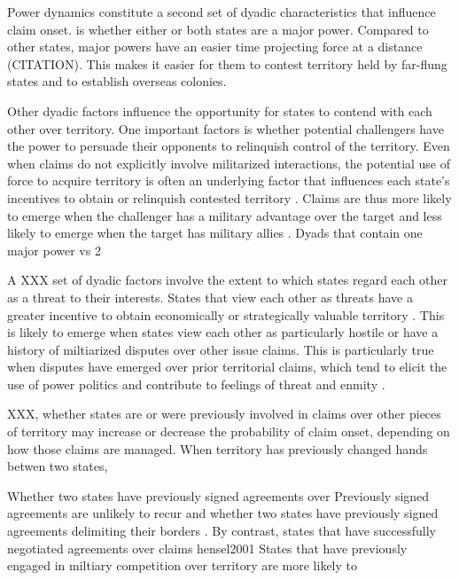 Power dynamics constitute a second set of dyadic characteristics that influence claim onset.
is whether either or both states are a major power. Compared to other states, major powers have an easier time projecting force at a distance (CITATION). This makes it easier for them to contest territory held by far-flung states and to establish overseas colonies.

Other dyadic factors influence the opportunity for states to contend with each other over territory. One important factors is whether potential challengers have the power to persuade their opponents to relinquish control of the territory. Even when claims do not explicitly involve militarized interactions, the potential use of force to acquire territory is often an underlying factor that influences each state’s incentives to obtain or relinquish contested territory \citep{huth2009, waltz2010}. Claims are thus more likely to emerge when the challenger has a military advantage over the target and less likely to emerge when the target has military allies \citep{huth2009}. 
Dyads that contain one major power vs 2

A XXX set of dyadic factors involve the extent to which states regard each other as a threat to their interests. States that view each other as threats have a greater incentive to obtain economically or strategically valuable territory \citep{colaresi2007, goertz2001}. This is likely to emerge when states view each other as particularly hostile or have a history of miltiarized disputes over other issue claims. This is particularly true when disputes have emerged over prior territorial claims, which tend to elicit the use of power politics and contribute to feelings of threat and enmity \citep{hensel2001, vasquez2009}.




XXX, whether states are or were previously involved in claims over other pieces of territory may increase or decrease the probability of claim onset, depending on how those claims are managed.
When territory has previously changed hands betwen two states,

Whether two states have previously signed agreements over 
Previously signed agreements are unlikely to recur
and whether two states have previously signed agreements delimiting their borders \citep{owsiak2012, huth2009}. %
By contrast, states that have successfully negotiated agreements over claims 
hensel2001
States that have previously engaged in miltiary competition over territory are more likely to 


